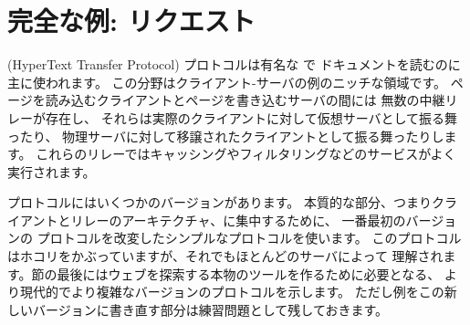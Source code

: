 \section{完全な例: {\normalfont \http} リクエスト}

\http (HyperText Transfer Protocol) プロトコルは有名な  で
ドキュメントを読むのに主に使われます。
この分野はクライアント-サーバの例のニッチな領域です。
ページを読み込むクライアントとページを書き込むサーバの間には
無数の中継リレーが存在し、
それらは実際のクライアントに対して仮想サーバとして振る舞ったり、
物理サーバに対して移譲されたクライアントとして振る舞ったりします。
これらのリレーではキャッシングやフィルタリングなどのサービスがよく実行されます。

\http プロトコルにはいくつかのバージョンがあります。
本質的な部分、つまりクライアントとリレーのアーキテクチャ、に集中するために、
一番最初のバージョンの \http プロトコルを改変したシンプルなプロトコルを使います。
このプロトコルはホコリをかぶっていますが、それでもほとんどのサーバによって
理解されます。節の最後にはウェブを探索する本物のツールを作るために必要となる、
より現代的でより複雑なバージョンのプロトコルを示します。
ただし例をこの新しいバージョンに書き直す部分は練習問題として残しておきます。

